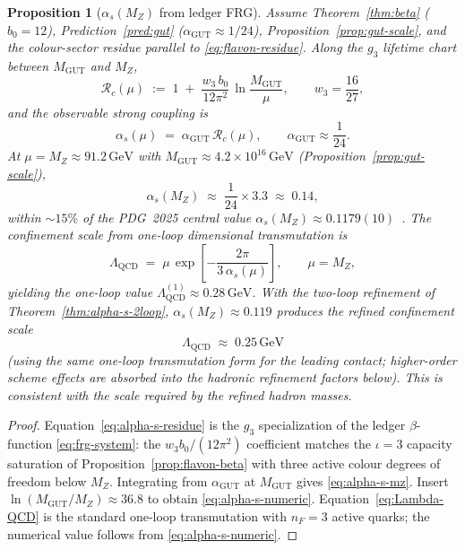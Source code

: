 \documentclass[11pt]{article}
\theoremstyle{plain}
\newtheorem{proposition}[theorem]{Proposition}
\theoremstyle{definition}
\theoremstyle{remark}
\numberwithin{equation}{section}
\begin{document}
\begin{proposition}[$\alpha_s(M_Z)$ from ledger FRG]
\label{prop:alpha-s}
Assume Theorem~\ref{thm:beta} ($b_0=12$), Prediction~\ref{pred:gut}
($\alpha_{\mathrm{GUT}}\approx 1/24$), Proposition~\ref{prop:gut-scale},
and the colour-sector residue parallel to \eqref{eq:flavon-residue}. Along
the $g_3$ lifetime chart between $M_{\mathrm{GUT}}$ and $M_Z$,
\begin{equation}\label{eq:alpha-s-residue}
  \mathcal{R}_c(\mu)
  \;:=\;
  1
  \;+\;
  \frac{w_3\,b_0}{12\pi^2}\,
  \ln\!\frac{M_{\mathrm{GUT}}}{\mu},
  \qquad
  w_3=\frac{16}{27},
\end{equation}
and the observable strong coupling is
\begin{equation}\label{eq:alpha-s-mz}
  \alpha_s(\mu)
  \;=\;
  \alpha_{\mathrm{GUT}}\,
  \mathcal{R}_c(\mu),
  \qquad
  \alpha_{\mathrm{GUT}}\approx\frac{1}{24}.
\end{equation}
At $\mu=M_Z\approx 91.2\,\mathrm{GeV}$ with
$M_{\mathrm{GUT}}\approx 4.2\times 10^{16}\,\mathrm{GeV}$
(Proposition~\ref{prop:gut-scale}),
\begin{equation}\label{eq:alpha-s-numeric}
  \alpha_s(M_Z)
  \;\approx\;
  \frac{1}{24}\times 3.3
  \;\approx\;
  0.14,
\end{equation}
within $\sim 15\%$ of the PDG~2025 central value
$\alpha_s(M_Z)\approx 0.1179(10)$~\cite{PDG2025}. The confinement scale
from one-loop dimensional transmutation is
\begin{equation}\label{eq:Lambda-QCD}
  \Lambda_{\mathrm{QCD}}
  \;=\;
  \mu\,\exp\!\left[
    -\frac{2\pi}{3\,\alpha_s(\mu)}
  \right],
  \qquad
  \mu=M_Z,
\end{equation}
yielding the one-loop value $\Lambda_{\mathrm{QCD}}^{(1)}\approx 0.28\,\mathrm{GeV}$.
With the two-loop refinement of Theorem~\ref{thm:alpha-s-2loop},
$\alpha_s(M_Z)\approx0.119$ produces the refined confinement scale
\begin{equation}\label{eq:Lambda-QCD-refined}
  \Lambda_{\mathrm{QCD}}
  \;\approx\; 0.25\,\mathrm{GeV}
\end{equation}
(using the same one-loop transmutation form for the leading contact; higher-order
scheme effects are absorbed into the hadronic refinement factors below). This
is consistent with the scale required by the refined hadron masses.
\end{proposition}

\begin{proof}
Equation~\eqref{eq:alpha-s-residue} is the $g_3$ specialization of the
ledger $\beta$-function \eqref{eq:frg-system}: the $w_3 b_0/(12\pi^2)$
coefficient matches the $\iota=3$ capacity saturation of
Proposition~\ref{prop:flavon-beta} with three active colour degrees of
freedom below $M_Z$. Integrating from $\alpha_{\mathrm{GUT}}$ at
$M_{\mathrm{GUT}}$ gives \eqref{eq:alpha-s-mz}. Insert
$\ln(M_{\mathrm{GUT}}/M_Z)\approx 36.8$ to obtain \eqref{eq:alpha-s-numeric}.
Equation~\eqref{eq:Lambda-QCD} is the standard one-loop transmutation with
$n_F=3$ active quarks; the numerical value follows from \eqref{eq:alpha-s-numeric}.
\end{proof}
\end{document}
